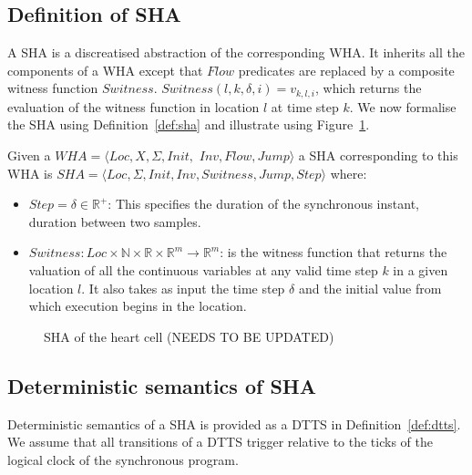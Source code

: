 \subsection{Definition of \acf{SHA}}

A \ac{SHA} is a discreatised  abstraction of the corresponding \ac{WHA}. It inherits all the
components of a \ac{WHA} except that $Flow$ predicates are replaced by a
composite witness function $Switness$.
$Switness(l,k, \delta, i)=v_{k,l,i}$, which returns the evaluation of
the witness function in location $l$ at time step $k$.
We now formalise
the \ac{SHA} using Definition~\ref{def:sha} and illustrate using Figure~\ref{fig:heartCellSHA}.



\begin{definition}
	Given a 
	$WHA = \langle Loc, X, \Sigma, Init,$ $ Inv, Flow, Jump \rangle$ a \ac{SHA} corresponding to
	this \ac{WHA} is \newline
	$SHA = \langle Loc,  \Sigma, Init, Inv, Switness, Jump, Step \rangle$ where:
	\begin{itemize}
		\item $Step = \delta \in \mathbb{R}^+$: This specifies the duration of the synchronous instant,  duration between 
		two samples.
		\item
		$Switness: Loc \times \mathbb{N} \times \mathbb{R} \times
		\mathbb{R}^m \rightarrow \mathbb{R}^m$:
		is the witness function that returns the valuation of all the
		continuous variables at any valid time step $k$ in a given location
		$l$. It also takes as input the time step $\delta$ and the initial
		value from which execution begins in the location.
	\end{itemize}
	\label{def:sha}
\end{definition}


\begin{figure}
	\centering
	
	\caption{\acf{SHA} of the heart cell (NEEDS TO BE UPDATED) \label{fig:heartCellSHA}}
\end{figure}

\subsection{Deterministic semantics of \ac{SHA}}
Deterministic semantics of a \ac{SHA} is provided as a \acf{DTTS} in
Definition~\ref{def:dtts}. We assume that all transitions of a \acf{DTTS}
trigger relative to the ticks of the logical clock of the synchronous
program.

